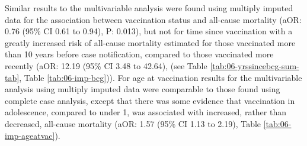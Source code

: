 \documentclass[11pt,twoside]{bristolthesis}
\begin{document}
  Similar results to the multivariable analysis were found using multiply imputed data for the association between vaccination status and all-cause mortality (aOR: 0.76 (95\% CI 0.61 to 0.94), P: 0.013), but not for time since vaccination with a greatly increased risk of all-cause mortality estimated for those vaccinated more than 10 years before case notification, compared to those vaccinated more recently (aOR: 12.19 (95\% CI 3.48 to 42.64), (see Table \ref{tab:06-yrssincebcg-sum-tab}, Table \ref{tab:06-imp-bcg})). For age at vaccination results for the multivariable analysis using multiply imputed data were comparable to those found using complete case analysis, except that there was some evidence that vaccination in adolescence, compared to under 1, was associated with increased, rather than decreased, all-cause mortality (aOR: 1.57 (95\% CI 1.13 to 2.19), Table \ref{tab:06-imp-ageatvac}).
\end{document}
